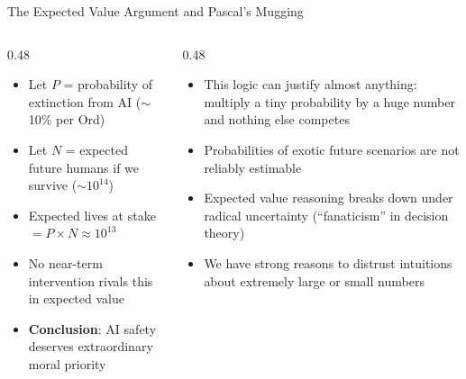 \documentclass[aspectratio=169,11pt]{beamer}
\begin{document}
\begin{frame}{The Expected Value Argument and Pascal's Mugging}
\begin{columns}[T]
\begin{column}{0.48\textwidth}
\begin{argumentbox}
\scriptsize
\begin{itemize}
    \item Let $P$ = probability of extinction from AI ($\sim$10\% per Ord)
    \item Let $N$ = expected future humans if we survive ($\sim$$10^{14}$)
    \item Expected lives at stake $= P \times N \approx 10^{13}$
    \item No near-term intervention rivals this in expected value
    \item \textbf{Conclusion}: AI safety deserves extraordinary moral priority
\end{itemize}
\end{argumentbox}
\end{column}
\begin{column}{0.48\textwidth}
\begin{objectionbox}
\scriptsize
\begin{itemize}
    \item This logic can justify almost anything: multiply a tiny probability by a huge number and nothing else competes
    \item Probabilities of exotic future scenarios are not reliably estimable
    \item Expected value reasoning breaks down under radical uncertainty (``fanaticism'' in decision theory)
    \item We have strong reasons to distrust intuitions about extremely large or small numbers
\end{itemize}
\end{objectionbox}
\end{column}
\end{columns}
\end{frame}
\end{document}
